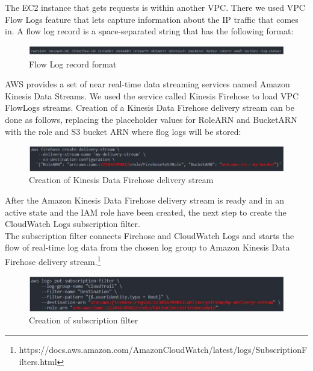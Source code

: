         The EC2 instance that gets requests is within another VPC. There we used VPC Flow Logs feature that lets capture information about the IP traffic that comes in. A flow log record is a space-separated string that has the following format:
            \begin{figure}[h]
                \centering
                \includegraphics[width=1\textwidth]{images/flow-log-format.png}
                \caption{Flow Log record format}
                \label{fig:flow-log-format}
            \end{figure}
        \FloatBarrier
        AWS provides a set of near real-time data streaming services named Amazon Kinesis Data Streams. We used the service called Kinesis Firehose to load VPC FlowLogs streams. Creation of a Kinesis Data Firehose delivery stream can be done as follows, replacing the placeholder values for RoleARN and BucketARN with the role and S3 bucket ARN where flog logs will be stored:
        \begin{figure}[h]
            \centering
            \includegraphics[width=1\textwidth]{images/kinesis-firehose.png}
            \caption{Creation of Kinesis Data Firehose delivery stream}
            \label{fig:kinesis_firehose_delivery}
        \end{figure}
        \FloatBarrier
        After the Amazon Kinesis Data Firehose delivery stream is ready and in an active state and the IAM role have been created, the next step to create the CloudWatch Logs subscription filter. \\
        The subscription filter connects Firehose and CloudWatch Logs and starts the flow of real-time log data from the chosen log group to Amazon Kinesis Data Firehose delivery stream.\footnote{ https://docs.aws.amazon.com/AmazonCloudWatch/latest/logs/SubscriptionFilters.html}\\
        \begin{figure}[h]
            \centering
            \includegraphics[width=1\textwidth]{images/subscription-filter-creation.png}
            \caption{Creation of subscription filter}
            \label{fig:subscription_filter_creation}
        \end{figure}
